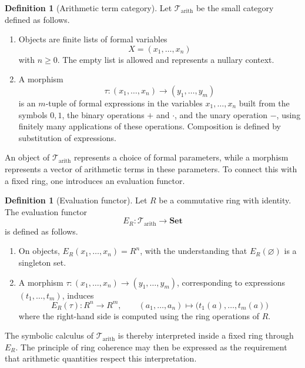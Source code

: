 \documentclass[10pt, reqno]{amsart}
\theoremstyle{plain}
\theoremstyle{definition}
\newtheorem{definition}[theorem]{Definition}
\theoremstyle{plain}
\begin{document}
\begin{definition}[Arithmetic term category]\label{def:ArithmeticTermCategory}
Let $\mathcal{T}_\mathrm{arith}$ be the small category defined as follows.

\begin{enumerate}
\item[(i)] Objects are finite lists of formal variables
  \[
    X = (x_1,\dots,x_n)
  \]
with $n \geq 0$. The empty list is allowed and represents a nullary context.

\item[(ii)] A morphism
  \[
    \tau \colon (x_1,\dots,x_n) \longrightarrow (y_1,\dots,y_m)
  \]
is an $m$-tuple of formal expressions in the variables $x_1,\dots,x_n$ built from the symbols $0,1$, the binary operations $+$ and $\cdot$, and the unary operation $-$, using finitely many applications of these operations. Composition is defined by substitution of expressions.
\end{enumerate}
\end{definition}

An object of $\mathcal{T}_\mathrm{arith}$ represents a choice of formal parameters, while a morphism represents a vector of arithmetic terms in these parameters. To connect this with a fixed ring, one introduces an evaluation functor.

\begin{definition}[Evaluation functor]\label{def:EvaluationFunctor}
Let $R$ be a commutative ring with identity. The evaluation functor
\[
  E_R \colon \mathcal{T}_\mathrm{arith} \longrightarrow \mathbf{Set}
\]
is defined as follows.

\begin{enumerate}
\item[(i)] On objects, $E_R(x_1,\dots,x_n) = R^n$, with the understanding that $E_R(\varnothing)$ is a singleton set.

\item[(ii)] A morphism $\tau \colon (x_1,\dots,x_n) \to (y_1,\dots,y_m)$, corresponding to expressions $(t_1,\dots,t_m)$, induces
  \[
    E_R(\tau) \colon R^n \longrightarrow R^m,
    \qquad
    (a_1,\dots,a_n) \longmapsto \bigl(t_1(a),\dots,t_m(a)\bigr)
  \]
where the right-hand side is computed using the ring operations of $R$.
\end{enumerate}
\end{definition}

The symbolic calculus of $\mathcal{T}_\mathrm{arith}$ is thereby interpreted inside a fixed ring through $E_R$. The principle of ring coherence may then be expressed as the requirement that arithmetic quantities respect this interpretation.
\end{document}

